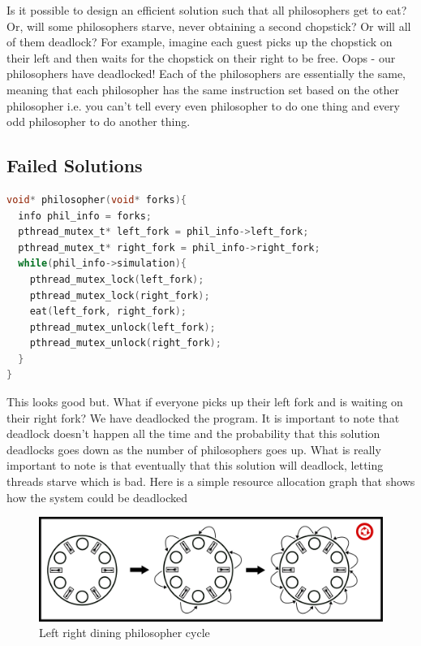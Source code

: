 Is it possible to design an efficient solution such that all philosophers get to eat?
Or, will some philosophers starve, never obtaining a second chopstick?
Or will all of them deadlock?
For example, imagine each guest picks up the chopstick on their left and then waits for the chopstick on their right to be free.
Oops - our philosophers have deadlocked!
Each of the philosophers are essentially the same, meaning that each philosopher has the same instruction set based on the other philosopher i.e. you can't tell every even philosopher to do one thing and every odd philosopher to do another thing.


\subsection{Failed Solutions}

\begin{lstlisting}[language=C]
void* philosopher(void* forks){
  info phil_info = forks;
  pthread_mutex_t* left_fork = phil_info->left_fork;
  pthread_mutex_t* right_fork = phil_info->right_fork;
  while(phil_info->simulation){
    pthread_mutex_lock(left_fork);
    pthread_mutex_lock(right_fork);
    eat(left_fork, right_fork);
    pthread_mutex_unlock(left_fork);
    pthread_mutex_unlock(right_fork);
  }
}
\end{lstlisting}

This looks good but.
What if everyone picks up their left fork and is waiting on their right fork? We have deadlocked the program.
It is important to note that deadlock doesn't happen all the time and the probability that this solution deadlocks goes down as the number of philosophers goes up.
What is really important to note is that eventually that this solution will deadlock, letting threads starve which is bad.
Here is a simple resource allocation graph that shows how the system could be deadlocked

\begin{figure}[H]
\centering
\includegraphics[width=.9\textwidth]{deadlock/drawings/dining_naive.eps}
\caption{Left right dining philosopher cycle}
\end{figure}


